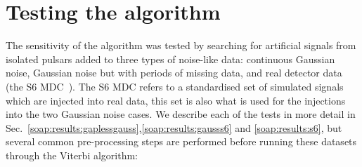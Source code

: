 \section{\label{soap:results} Testing the algorithm}
%
%
The sensitivity of the algorithm was tested by searching for artificial
signals from isolated pulsars added to three types of noise-like data:
continuous Gaussian noise, Gaussian noise but with periods of missing data,
and real detector data (the S6 \gls{MDC}~\citep{walsh2016ComparisonMethods}). The S6 \gls{MDC} refers to a standardised set of simulated signals which are injected into real data, this set is also what is used for the injections into the two Gaussian noise cases. We describe each
of the tests in more detail in Sec.~\ref{soap:results:gaplessgauss},\ref{soap:results:gausss6} and
\ref{soap:results:s6}, but several common pre-processing steps are performed
before running these datasets through the Viterbi algorithm:
%
%

